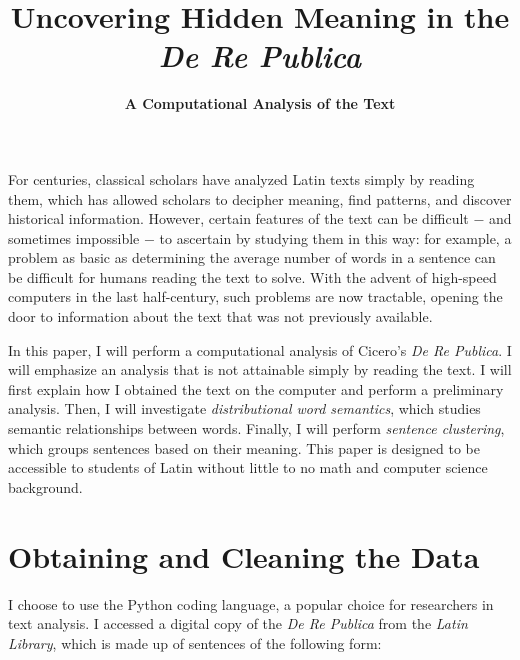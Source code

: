 \documentclass[a4paper, 12pt,notitlepage]{article} %
\numberwithin{dummy}{subsection}
\numberwithin{dummy}{section}
\theoremstyle{named}
\theoremstyle{definition}
\theoremstyle{definition}
\begin{document}
	\setlength{\droptitle}{-15.5em}
	\title{\textbf{Uncovering Hidden Meaning in the \textit{De Re Publica}}\vspace{-2.5ex}}
	\author{{\Large \textbf{A Computational Analysis of the Text}}}
\date{}
	
	\maketitle
	\vspace{-50pt}
	
	\doublespacing
	
	\thispagestyle{fancy}
	\cfoot{}
	
	For centuries, classical scholars have analyzed Latin texts simply by reading them, which has allowed scholars to decipher meaning, find patterns, and discover historical information. However, certain features of the text can be difficult $-$ and sometimes impossible $-$ to ascertain by studying them in this way: for example, a problem as basic as determining the average number of words in a sentence can be difficult for humans reading the text to solve. With the advent of high-speed computers in the last half-century, such problems are now tractable, opening the door to information about the text that was not previously available.
	
	In this paper, I will perform a computational analysis of Cicero's \textit{De Re Publica}. I will emphasize an analysis that is not attainable simply by reading the text. I will first explain how I obtained the text on the computer and perform a preliminary analysis. Then, I will investigate \textit{distributional word semantics}, which studies semantic relationships between words. Finally, I will perform \textit{sentence clustering}, which groups sentences based on their meaning. This paper is designed to be accessible to students of Latin without little to no math and computer science background.
	
	\pagestyle{myheadings}
	
	\section{Obtaining and Cleaning the Data}
	
	I choose to use the Python coding language, a popular choice for researchers in text analysis. I accessed a digital copy of the \textit{De Re Publica} from the \textit{Latin Library}, which is made up of sentences of the following form:
	
\end{document}
